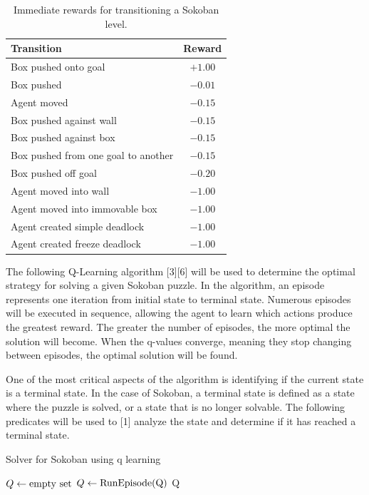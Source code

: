\documentclass[times, 10pt,twocolumn]{article}
\begin{document}
\begin{table}[htbp]
  \centering
  \begin{tabular}{l c} \hline\hline
    Transition & Reward \\ \hline
    Box pushed onto goal & $+1.00$ \\
    Box pushed & $-0.01$ \\
    Agent moved & $-0.15$ \\
    Box pushed against wall & $-0.15$ \\
    Box pushed against box & $-0.15$ \\
    Box pushed from one goal to another & $-0.15$ \\
    Box pushed off goal & $-0.20$ \\ 
    Agent moved into wall & $-1.00$ \\
    Agent moved into immovable box & $-1.00$ \\
    Agent created simple deadlock & $-1.00$ \\
    Agent created freeze deadlock & $-1.00$ \\ \hline\hline
  \end{tabular}
  \caption{Immediate rewards for transitioning a Sokoban level.}
  \label{table:rewards}
\end{table}


The following Q-Learning algorithm [3][6] will be used to determine the optimal strategy for solving a given Sokoban puzzle. In the algorithm, an episode represents one iteration from initial state to terminal state. Numerous episodes will be executed in sequence, allowing the agent to learn which actions produce the greatest reward. The greater the number of episodes, the more optimal the solution will become. When the q-values converge, meaning they stop changing between episodes, the optimal solution will be found.

One of the most critical aspects of the algorithm is identifying if the current state is a terminal state. In the case of Sokoban, a terminal state is defined as a state where the puzzle is solved, or a state that is no longer solvable. The following predicates will be used to [1] analyze the state and determine if it has reached a terminal state.

\begin{algorithm}
  \caption{Solver for Sokoban using q learning}
  \begin{algorithmic}[2]
      \State $Q\gets \textnormal{empty set}$
        \State $Q\gets \textnormal{RunEpisode(Q)}$
      \EndFor
      \Return Q
    \EndFunction
  \end{algorithmic}
\end{algorithm}
\end{document}
